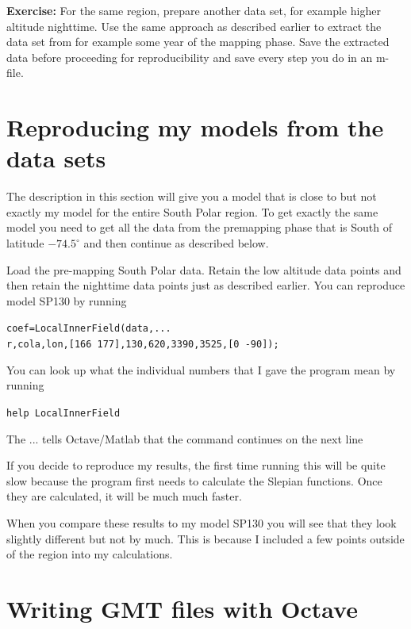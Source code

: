 \documentclass[11pt]{article}
\begin{document}
\textbf{Exercise:} For the same region, prepare another data set, for example higher altitude nighttime. Use the same approach as described earlier to extract the data set from for example some year of the mapping phase. Save the extracted data before proceeding for reproducibility and save every step you do in an m-file.




 







\section{Reproducing my models from the data sets}\label{repro}
The description in this section will give you a model that is close to but not exactly my model for the entire South Polar region. To get exactly the same model you need to get all the data from the premapping phase that is South of latitude $-74.5^\circ$ and then continue as described below.

Load the pre-mapping South Polar data. Retain the low altitude data points and then retain the nighttime data points just as described earlier. You can reproduce model SP130 by running

\qquad \verb+coef=LocalInnerField(data,...+\\
\verb+r,cola,lon,[166 177],130,620,3390,3525,[0 -90]);+

You can look up what the individual numbers that I gave the program mean by running

\qquad \verb+help LocalInnerField+

The ... tells Octave/Matlab that the command continues on the next line

If you decide to reproduce my results, the first time running this will be quite slow because the program first needs to calculate the Slepian functions. Once they are calculated, it will be much much faster.

When you compare these results to my model SP130 you will see that they look slightly different but not by much. This is because I included a few points outside of the region into my calculations.


\section{Writing GMT files with Octave}\label{OctaveGMT}
\end{document}
